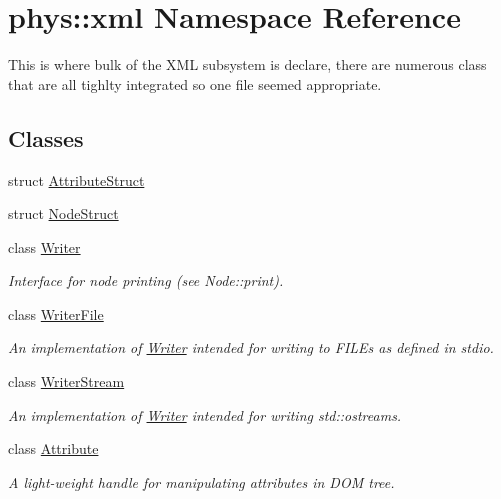 \hypertarget{namespacephys_1_1xml}{
\section{phys::xml Namespace Reference}
\label{d9/d27/namespacephys_1_1xml}
}


This is where bulk of the XML subsystem is declare, there are numerous class that are all tighlty integrated so one file seemed appropriate.  


\subsection*{Classes}
\begin{DoxyCompactItemize}
\item 
struct \hyperlink{structphys_1_1xml_1_1AttributeStruct}{AttributeStruct}
\item 
struct \hyperlink{structphys_1_1xml_1_1NodeStruct}{NodeStruct}
\item 
class \hyperlink{classphys_1_1xml_1_1Writer}{Writer}
\begin{DoxyCompactList}\small\item\em Interface for node printing (see Node::print). \item\end{DoxyCompactList}\item 
class \hyperlink{classphys_1_1xml_1_1WriterFile}{WriterFile}
\begin{DoxyCompactList}\small\item\em An implementation of \hyperlink{classphys_1_1xml_1_1Writer}{Writer} intended for writing to FILEs as defined in stdio. \item\end{DoxyCompactList}\item 
class \hyperlink{classphys_1_1xml_1_1WriterStream}{WriterStream}
\begin{DoxyCompactList}\small\item\em An implementation of \hyperlink{classphys_1_1xml_1_1Writer}{Writer} intended for writing std::ostreams. \item\end{DoxyCompactList}\item 
class \hyperlink{classphys_1_1xml_1_1Attribute}{Attribute}
\begin{DoxyCompactList}\small\item\em A light-\/weight handle for manipulating attributes in DOM tree. \item\end{DoxyCompactList}\item 

\end{DoxyCompactItemize}
